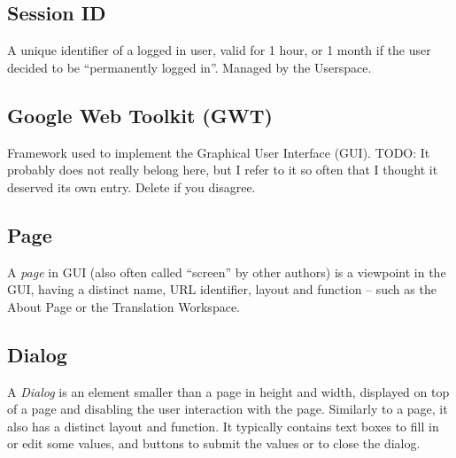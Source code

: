 \subsection*{Session ID}
A unique identifier of a logged in user, valid for 1 hour, or 1 month if the user decided to be ``permanently logged in''. Managed by the Userspace.

\subsection*{Google Web Toolkit (GWT)}
Framework used to implement the Graphical User Interface (GUI).
TODO: It probably does not really belong here, but I refer to it so often that I thought it deserved its own entry. Delete if you disagree.

\subsection*{Page}
A \emph{page} in GUI (also often called ``screen'' by other authors) is a viewpoint in the GUI, having a distinct name, URL identifier, layout and function -- such as the About Page or the Translation Workspace.

\subsection*{Dialog}
A \emph{Dialog} is an element smaller than a page in height and width, displayed on top of a page and disabling the user interaction with the page. Similarly to a page, it also has a distinct layout and function. It typically contains text boxes to fill in or edit some values, and buttons to submit the values or to close the dialog.

